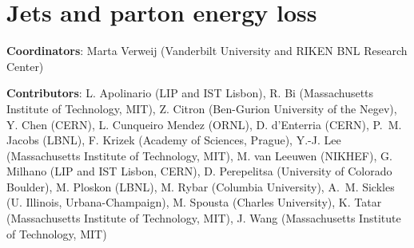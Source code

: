 \documentclass[../report.tex]{subfiles}
\providecommand{\main}{..}
\begin{document}
\section{Jets and parton energy loss}\label{sec:HI_Jets}

{ \small
  \noindent \textbf{Coordinators}: Marta Verweij (Vanderbilt University and RIKEN BNL Research Center)
  
  \noindent \textbf{Contributors}:
L. Apolinario (LIP and IST Lisbon),
R. Bi (Massachusetts Institute of Technology, MIT),
Z. Citron (Ben-Gurion University of the Negev),
Y. Chen (CERN),
L. Cunqueiro Mendez (ORNL),
D. d'Enterria (CERN),
P.~M. Jacobs (LBNL),
F. Krizek (Academy of Sciences, Prague),
Y.-J. Lee (Massachusetts Institute of Technology, MIT),
M. van Leeuwen (NIKHEF),
G. Milhano (LIP and IST Lisbon, CERN),
D. Perepelitsa (University of Colorado Boulder),
M. Ploskon (LBNL),
M. Rybar (Columbia University),
A.~M. Sickles (U. Illinois, Urbana-Champaign),
M. Spousta (Charles University),
K. Tatar (Massachusetts Institute of Technology, MIT),
J. Wang  (Massachusetts Institute of Technology, MIT)
}



\newpage

\newpage

\newpage

%
\end{document}
